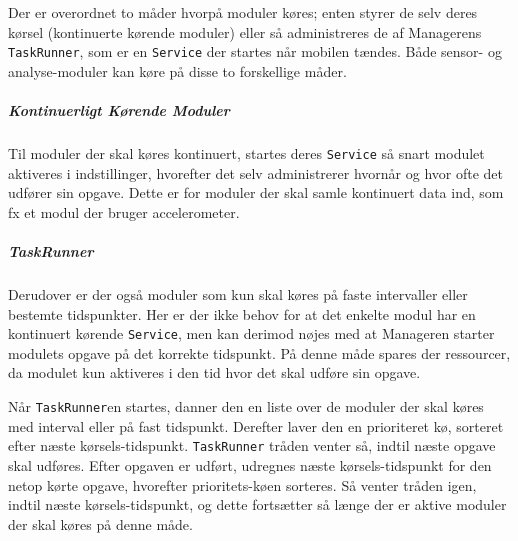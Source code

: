 Der er overordnet to måder hvorpå moduler køres; enten styrer de selv deres kørsel (kontinuerte kørende moduler) eller så administreres de af Managerens \texttt{TaskRunner}, som er en \texttt{Service} der startes når mobilen tændes.
Både sensor- og analyse-moduler kan køre på disse to forskellige måder.

\subparagraph{Kontinuerligt Kørende Moduler}
Til moduler der skal køres kontinuert, startes deres \texttt{Service} så snart modulet aktiveres i indstillinger, hvorefter det selv administrerer hvornår og hvor ofte det udfører sin opgave.
Dette er for moduler der skal samle kontinuert data ind, som fx et modul der bruger accelerometer.

\subparagraph{TaskRunner}
Derudover er der også moduler som kun skal køres på faste intervaller eller bestemte tidspunkter.
Her er der ikke behov for at det enkelte modul har en kontinuert kørende \texttt{Service}, men kan derimod nøjes med at Manageren starter modulets opgave på det korrekte tidspunkt.
På denne måde spares der ressourcer, da modulet kun aktiveres i den tid hvor det skal udføre sin opgave. 

Når \texttt{TaskRunner}en startes, danner den en liste over de moduler der skal køres med interval eller på fast tidspunkt.
Derefter laver den en prioriteret kø, sorteret efter næste kørsels-tidspunkt.
\texttt{TaskRunner} tråden venter så, indtil næste opgave skal udføres.
Efter opgaven er udført, udregnes næste kørsels-tidspunkt for den netop kørte opgave, hvorefter prioritets-køen sorteres.
Så venter tråden igen, indtil næste kørsels-tidspunkt, og dette fortsætter så længe der er aktive moduler der skal køres på denne måde.
